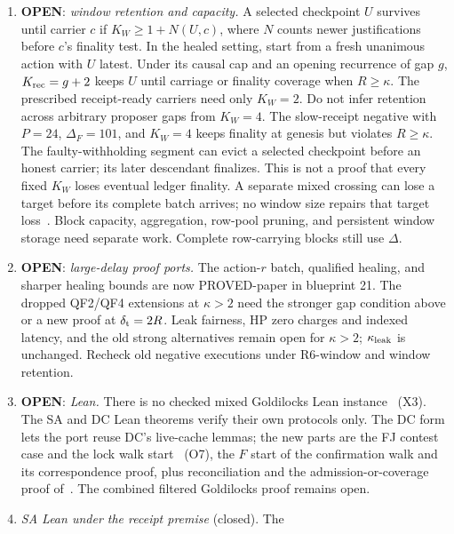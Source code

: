 \documentclass{article}
\theoremstyle{plain}
\theoremstyle{definition}
\theoremstyle{remark}
\newcommand{\LDP}[1]{\cite[\S#1]{LDP}}
\newcommand{\OPEN}{\textbf{OPEN}}
\begin{document}
\begin{enumerate}[leftmargin=*]
  removed by capacity, the union keeps only that earlier read.  Thus the
  union stays below quorum and keeps the strict size bound.  Its fairness
  benefit for $\kappa>2$ needs a proof.  This option is not adopted;
  Figure~\ref{alg:leak} keeps the first-replacement read.
\item \OPEN: \emph{window retention and capacity.}
  A selected checkpoint $U$ survives until carrier $c$ if
  $K_W\geq1+N(U,c)$, where $N$ counts newer justifications before $c$'s
  finality test.  In the healed setting, start from a fresh unanimous
  action with $U$ latest.  Under its causal cap and an opening recurrence
  of gap $g$, $K_{\rm rec}=g+2$ keeps $U$ until carriage or finality
  coverage when $R\geq\kappa$.  The prescribed receipt-ready carriers need only $K_W=2$.
  Do not infer retention across arbitrary proposer gaps from $K_W=4$.
  The slow-receipt negative with $P=24$, $\Delta_F=101$, and $K_W=4$
  keeps finality at genesis but violates $R\geq\kappa$.
  The faulty-withholding segment can evict a selected checkpoint
  before an honest carrier; its later descendant finalizes.  This is
  not a proof that every fixed $K_W$ loses eventual ledger finality.
  A separate mixed crossing can lose a target before its complete
  batch arrives; no window size repairs that target loss~\cite[\S3]{FW}.
  Block capacity, aggregation, row-pool pruning, and persistent window
  storage need separate work.  Complete row-carrying blocks still use $\Delta$.
\item \OPEN: \emph{large-delay proof ports.}
  The action-$r$ batch, qualified healing, and sharper healing bounds
  are now PROVED-paper in blueprint 21.  The dropped QF2/QF4 extensions at $\kappa>2$ need the stronger gap condition
  above or a new proof at $\delta_{\rm t}=2R$.
  Leak fairness, HP zero charges and indexed latency, and the old strong
  alternatives remain open for $\kappa>2$; $\kappa_{\rm leak}$ is unchanged.
  Recheck old negative executions under R6-window and window retention.
\item \OPEN: \emph{Lean.}  There is no checked mixed Goldilocks Lean
  instance~\LDP{7} (X3).  The SA and DC Lean
  theorems verify their own protocols only.  The DC form lets the port
  reuse DC's live-cache lemmas; the new parts are the FJ contest case and
  the lock walk start~\LDP{7} (O7), the $F$ start of the confirmation
  walk and its correspondence proof, plus reconciliation and the
  admission-or-coverage proof of~\cite[\S\S2--7]{FB}.  The combined
  filtered Goldilocks proof remains open.
\item \emph{SA Lean under the receipt premise} (closed).  The

\end{enumerate}
\end{document}
